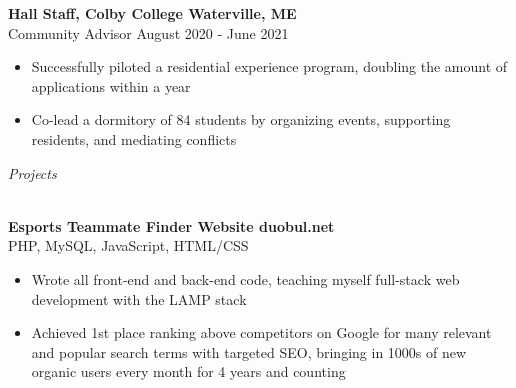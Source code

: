\documentclass[letterpaper]{article}
\newcommand{\lineunder} {
    \vspace*{-8pt} \\
    \hspace*{-3pt} \hrulefill \\
}
\newcommand{\header} [1] {
	{\hspace*{-3pt}\vspace*{6pt} \textit{#1}}
    \vspace*{-6pt} \lineunder
}
\newcommand{\expheader}[4]{
    \vspace{2mm}
    \textbf{#1 \hfill #2}\\
    #3 \hfill #4\\
    \vspace{-2mm}
}
\begin{document}
\expheader{Hall Staff, Colby College}{Waterville, ME}{Community Advisor}{August
2020 - June 2021}
\begin{itemize} \itemsep 0pt
    \item Successfully piloted a residential experience program, doubling the
		amount of applications within a year
	\item Co-lead a dormitory of 84 students by organizing events, supporting residents, and mediating conflicts
\end{itemize}

\vspace{2mm}





\header{Projects}
\vspace{-1mm}

\expheader{Esports Teammate Finder Website}{duobul.net}{PHP, MySQL, JavaScript, HTML/CSS}{}
\begin{itemize} \itemsep 0pt
\item Wrote all front-end and back-end code, teaching myself full-stack web development with the LAMP stack \\
\item Achieved 1st place ranking above competitors on Google for many relevant and popular search terms with targeted SEO, bringing in 1000s of new organic users every month for 4 years and counting\\

\end{itemize}
\end{document}
